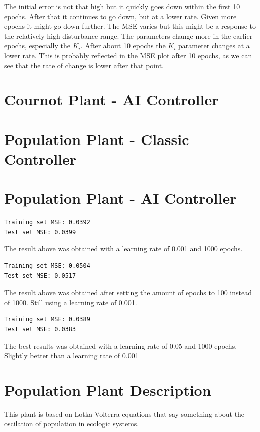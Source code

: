 \documentclass[12pt]{article}
\begin{document}
The initial error is not that high but it quickly goes down within the first 10 epochs. After that it continues
to go down, but at a lower rate. Given more epochs it might go down further. The MSE varies but this might be a response
to the relatively high disturbance range. The parameters change more in the earlier epochs, especially the $K_i$. After about
10 epochs the $K_i$ parameter changes at a lower rate. This is probably reflected in the MSE plot after 10 epochs, as we
can see that the rate of change is lower after that point.

\section*{Cournot Plant - AI Controller}

\section*{Population Plant - Classic Controller}

\section*{Population Plant - AI Controller}




\begin{verbatim}
Training set MSE: 0.0392
Test set MSE: 0.0399
\end{verbatim}

The result above was obtained with a learning rate of 0.001 and 1000 epochs. 

\begin{verbatim}
Training set MSE: 0.0504
Test set MSE: 0.0517
\end{verbatim}

The result above was obtained after setting the amount of epochs to 100 instead of 1000. Still using a learning rate of 0.001.

\begin{verbatim}
Training set MSE: 0.0389
Test set MSE: 0.0383
\end{verbatim}

The best results was obtained with a learning rate of 0.05 and 1000 epochs. Slightly better than a learning rate of
0.001

\section*{Population Plant Description}

This plant is based on Lotka-Volterra equations that say something about the oscilation of population
in ecologic systems.



\printbibliography
\end{document}
